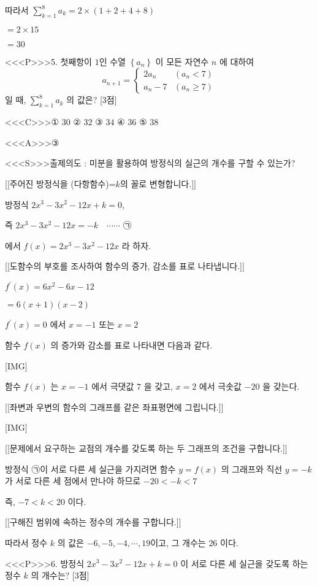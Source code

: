 \documentclass{oblivoir}
\begin{document}
따라서
$\displaystyle\sum_{k=1}^{8} a_{k}=2 \times(1+2+4+8)$

$=2 \times 15$

$=30$

<<<P>>>5. 첫째항이 $1$인 수열 $\left\{a_{n}\right\}$ 이 모든 자연수 $n$ 에 대하여
$$
a_{n+1}=\begin{cases}
2 a_{n} & \left(a_{n}<  7\right) \\
a_{n}-7 & \left(a_{n} \geq 7\right)
\end{cases}
$$
일 때, $\displaystyle\sum_{k=1}^{8} a_{k}$ 의 값은? [3점]

<<<C>>>① $30$
② $32$
③ $34$
④ $36$
⑤ $38$

<<<A>>>③

<<<S>>>출제의도 : 미분을 활용하여 방정식의 실근의 개수를 구할 수 있는가?


[[주어진 방정식을 (다항함수)=$k$의 꼴로 변형합니다.]]

방정식 $2 x^{3}-3 x^{2}-12 x+k=0$,

즉 $2 x^{3}-3 x^{2}-12 x=-k \quad \cdots \cdots$ ㉠

에서 $f(x)=2 x^{3}-3 x^{2}-12 x$ 라 하자.

[[도함수의 부호를 조사하여 함수의 증가, 감소를 표로 나타냅니다.]]

$f^{\prime}(x)=6 x^{2}-6 x-12$

$=6(x+1)(x-2)$

$f^{\prime}(x)=0$ 에서
$x=-1$ 또는 $x=2$

함수 $f(x)$ 의 증가와 감소를 표로 나타내면 다음과 같다.

[IMG]

함수 $f(x)$ 는 $x=-1$ 에서 극댓값 $7$ 을 갖고, $x=2$ 에서 극솟값 $-20$ 을 갖는다.

[[좌변과 우변의 함수의 그래프를 같은 좌표평면에 그립니다.]]

[IMG]

[[문제에서 요구하는 교점의 개수를 갖도록 하는 두 그래프의 조건을 구합니다.]]

방정식 ㉠이 서로 다른 세 실근을 가지려면 함수 $y=f(x)$ 의 그래프와 직선 $y=-k$ 가 서로 다른 세 점에서 만나야 하므로 $-20<  -k<  7$

즉, $-7<  k<  20$ 이다.

[[구해진 범위에 속하는 정수의 개수를 구합니다.]]

따라서 정수 $k$ 의 값은 $-6,-5,-4, \cdots, 19$이고, 그 개수는 $26$ 이다.

<<<P>>>6. 방정식 $2 x^{3}-3 x^{2}-12 x+k=0$ 이 서로 다른 세 실근을 갖도록 하는 정수 $k$ 의 개수는? [3점]
\end{document}
